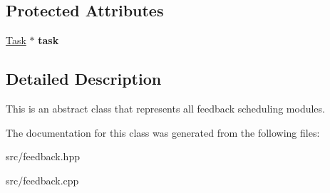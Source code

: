 \subsection*{Protected Attributes}
\begin{DoxyCompactItemize}
\item 
\hyperlink{classRTSim_1_1Task}{Task} $\ast$ {\bfseries task}\hypertarget{classRTSim_1_1AbstractFeedbackModule_a3e66db99922e9489dfd2b732bfe46035}{}\label{classRTSim_1_1AbstractFeedbackModule_a3e66db99922e9489dfd2b732bfe46035}

\end{DoxyCompactItemize}


\subsection{Detailed Description}
This is an abstract class that represents all feedback scheduling modules. 

The documentation for this class was generated from the following files\+:\begin{DoxyCompactItemize}
\item 
src/feedback.\+hpp\item 
src/feedback.\+cpp\end{DoxyCompactItemize}
